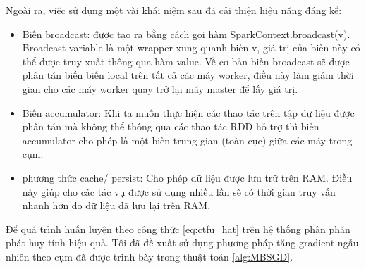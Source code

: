 Ngoài ra, việc sử dụng một vài khái niệm sau đã cải thiện hiệu năng đáng kể:
\begin{itemize}
	\item Biến broadcast: được tạo ra bằng cách gọi hàm SparkContext.broadcast(v). Broadcast variable là một wrapper xung quanh biến v, giá trị của biến này có thể được truy xuất thông qua hàm value. Về cơ bản biến broadcast sẽ được phân tán biến biến local trên tất cả các máy worker, điều này làm giảm thời gian cho các máy worker quay trở lại máy master để lấy giá trị.
	\item Biến accumulator: Khi ta muốn thực hiện các thao tác trên tập dữ liệu được phân tán mà không thể thông qua các thao tác RDD hỗ trợ thì biến accumulator cho phép là một biến trung gian (toàn cục) giữa các máy trong cụm. 
	\item phương thức cache/ persist: Cho phép dữ liệu được lưu trữ trên RAM. Điều này giúp cho các tác vụ được sử dụng nhiều lần sẽ có thời gian truy vấn nhanh hơn do dữ liệu đã lưu lại trên RAM.
\end{itemize}

Để quá trình huấn luyện theo công thức \ref{eq:ctfu_hat} trên hệ thống phân phán phát huy tính hiệu quả. Tôi đã đề xuất sử dụng phương pháp tăng gradient ngẫu nhiên theo cụm đã được trình bày trong thuật toán \ref{alg:MBSGD}.
